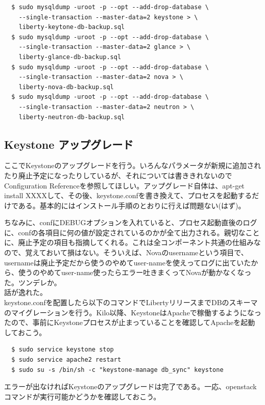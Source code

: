 \documentclass[9pt,b5paper,tombo,openany]{jsbook}
\begin{document}
\begin{lstlisting}
  $ sudo mysqldump -uroot -p --opt --add-drop-database \
    --single-transaction --master-data=2 keystone > \
    liberty-keytone-db-backup.sql
  $ sudo mysqldump -uroot -p --opt --add-drop-database \
    --single-transaction --master-data=2 glance > \
    liberty-glance-db-backup.sql
  $ sudo mysqldump -uroot -p --opt --add-drop-database \
    --single-transaction --master-data=2 nova > \
    liberty-nova-db-backup.sql
  $ sudo mysqldump -uroot -p --opt --add-drop-database \
    --single-transaction --master-data=2 neutron > \
    liberty-neutron-db-backup.sql
\end{lstlisting}

\subsection{Keystone アップグレード}
ここでKeystoneのアップグレードを行う。いろんなパラメータが新規に追加されたり廃止予定になったりしているが、それについては書ききれないのでConfiguration Referenceを参照してほしい。アップグレード自体は、apt-get install XXXXして、その後、keystone.confを書き換えて、プロセスを起動するだけである。基本的にはインストール手順のとおりに行えば問題ない(はず)。

ちなみに、confにDEBUGオプションを入れていると、プロセス起動直後のログに、confの各項目に何の値が設定されているのかが全て出力される。親切なことに、廃止予定の項目も指摘してくれる。これは全コンポーネント共通の仕組みなので、覚えておいて損はない。そういえば、Novaのusernameという項目で、usernameは廃止予定だから使うのやめてuser-nameを使えってログに出ていたから、使うのやめてuser-name使ったらエラー吐きまくってNovaが動かなくなった。ツンデレか。\\[1ex]

話が逸れた。\\[1ex]


keystone.confを配置したら以下のコマンドでLibertyリリースまでDBのスキーマのマイグレーションを行う。Kilo以降、KeystoneはApacheで稼働するようになったので、事前にKeystoneプロセスが止まっていることを確認してApacheを起動しておこう。

\begin{lstlisting}
  $ sudo service keystone stop
  $ sudo service apache2 restart
  $ sudo su -s /bin/sh -c "keystone-manage db_sync" keystone
\end{lstlisting}

エラーが出なければKeystoneのアップグレードは完了である。一応、openstackコマンドが実行可能かどうかを確認しておこう。
\end{document}
